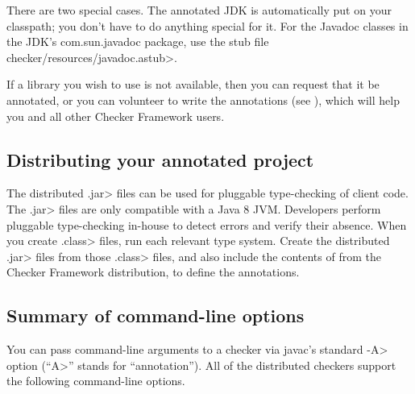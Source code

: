 There are two special cases.
The annotated JDK is automatically put on your
classpath; you don't have to do anything special for it.
For the Javadoc classes in the JDK's com.sun.javadoc package,
use the stub file \<checker/resources/javadoc.astub>.

If a library you wish to use is not available, then you can request that it
be annotated, or you can volunteer to write the annotations (see
), which will help you and all other
Checker Framework users.


\subsection{Distributing your annotated project\label{distributing}}

  The distributed
  \<.jar> files can be used for pluggable type-checking of client code.
  The \<.jar> files are only compatible with a Java 8
  JVM.
  Developers perform pluggable type-checking in-house to detect errors and
  verify their absence.
  When you create \<.class> files, run each relevant type system.
  Create the distributed \<.jar> files from those \<.class> files, and also
  include the contents of
   from the Checker
  Framework distribution, to define the annotations.

\subsection{Summary of command-line options\label{checker-options}}

You can pass command-line arguments to a checker via javac's standard \<-A>
option (``\<A>'' stands for ``annotation'').  All of the distributed
checkers support the following command-line options.



